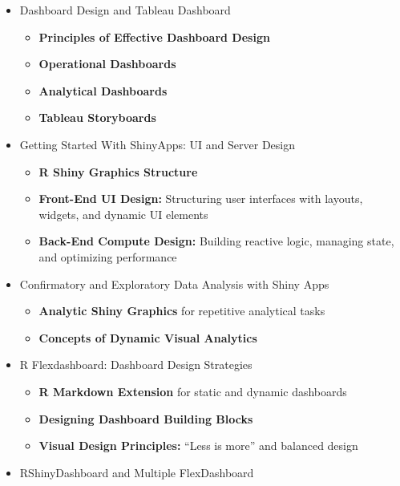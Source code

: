 \documentclass[
]{article}
\providecommand{\tightlist}{%
  \setlength{\itemsep}{0pt}\setlength{\parskip}{0pt}}
\begin{document}
\begin{itemize}
  \begin{itemize}
  \tightlist
  \item
    \textbf{Loading Data Sources}
  \item
    \textbf{View Type Selection}
  \item
    \textbf{Mark Cards:} Refining analytic graphics
  \item
    \textbf{Ensembling Graphics:} Building Tableau visuals through
    modular components
  \end{itemize}
\item
  Dashboard Design and Tableau Dashboard

  \begin{itemize}
  \tightlist
  \item
    \textbf{Principles of Effective Dashboard Design}
  \item
    \textbf{Operational Dashboards}
  \item
    \textbf{Analytical Dashboards}
  \item
    \textbf{Tableau Storyboards}
  \end{itemize}
\item
  Getting Started With ShinyApps: UI and Server Design

  \begin{itemize}
  \tightlist
  \item
    \textbf{R Shiny Graphics Structure}
  \item
    \textbf{Front-End UI Design:} Structuring user interfaces with
    layouts, widgets, and dynamic UI elements
  \item
    \textbf{Back-End Compute Design:} Building reactive logic, managing
    state, and optimizing performance
  \end{itemize}
\item
  Confirmatory and Exploratory Data Analysis with Shiny Apps

  \begin{itemize}
  \tightlist
  \item
    \textbf{Analytic Shiny Graphics} for repetitive analytical tasks
  \item
    \textbf{Concepts of Dynamic Visual Analytics}
  \end{itemize}
\item
  R Flexdashboard: Dashboard Design Strategies

  \begin{itemize}
  \tightlist
  \item
    \textbf{R Markdown Extension} for static and dynamic dashboards
  \item
    \textbf{Designing Dashboard Building Blocks}
  \item
    \textbf{Visual Design Principles:} ``Less is more'' and balanced
    design
  \end{itemize}
\item
  RShinyDashboard and Multiple FlexDashboard


\end{itemize}
\end{document}
